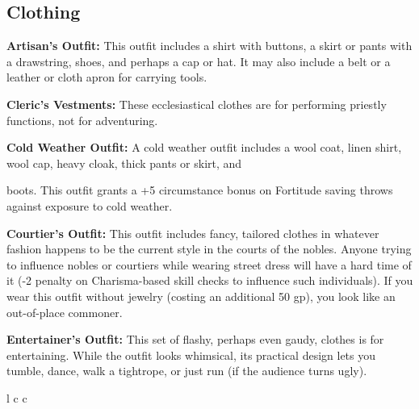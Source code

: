 \begin{multicols}{2}

\subsection{Clothing}

\textbf{Artisan's Outfit:} This outfit includes a shirt with buttons, a skirt or 
pants with a drawstring, shoes, and perhaps a cap or hat. It may also include a 
belt or a leather or cloth apron for carrying tools.

\textbf{Cleric's Vestments:} These ecclesiastical clothes are for performing priestly 
functions, not for adventuring.

\textbf{Cold Weather Outfit:} A cold weather outfit includes a wool coat, linen 
shirt, wool cap, heavy cloak, thick pants or skirt, and

boots. This outfit grants a +5 circumstance bonus on Fortitude saving throws against 
exposure to cold weather.

\textbf{Courtier's Outfit:} This outfit includes fancy, tailored clothes in whatever 
fashion happens to be the current style in the courts of the nobles. Anyone trying 
to influence nobles or courtiers while wearing street dress will have a hard time 
of it (-2 penalty on Charisma-based skill checks to influence such individuals). 
If you wear this outfit without jewelry (costing an additional 50 gp), you look 
like an out-of-place commoner.

\textbf{Entertainer's Outfit:} This set of flashy, perhaps even gaudy, clothes 
is for entertaining. While the outfit looks whimsical, its practical design lets 
you tumble, dance, walk a tightrope, or just run (if the audience turns ugly).

\begin{multicolsbasictable}{l c c}


\end{multicolsbasictable}
\end{multicols}

